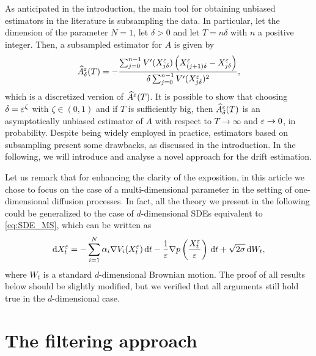 \documentclass[10pt]{article}
\begin{document}
As anticipated in the introduction, the main tool for obtaining unbiased estimators in the literature is subsampling the data. In particular, let the dimension of the parameter $N = 1$, let $\delta > 0$ and let $T = n\delta$ with $n$ a positive integer. Then, a subsampled estimator for $A$ is given by
\begin{equation}
	\widehat A^\varepsilon_\delta(T) = - \frac{\sum_{j=0}^{n-1} V'(X^\varepsilon_{j\delta})\left(X^\varepsilon_{(j+1)\delta} - X^\varepsilon_{j\delta}\right)}{\delta \sum_{j=0}^{n-1} V'(X^\varepsilon_{j\delta})^2},
\end{equation}
which is a discretized version of $\widehat A^\varepsilon(T)$. It is possible to show \cite[Theorem 3.5]{PaS07} that choosing $\delta = \varepsilon^\zeta$ with $\zeta \in (0, 1)$ and if $T$ is sufficiently big, then $\widehat A^\varepsilon_\delta(T)$ is an asymptotically unbiased estimator of $A$ with respect to $T \to \infty$ and $\varepsilon \to 0$, in probability. Despite being widely employed in practice, estimators based on subsampling present some drawbacks, as discussed in the introduction. In the following, we will introduce and analyse a novel approach for the drift estimation.

\begin{remark} Let us remark that for enhancing the clarity of the exposition, in this article we chose to focus on the case of a multi-dimensional parameter in the setting of one-dimensional diffusion processes. In fact, all the theory we present in the following could be generalized to the case of $d$-dimensional SDEs equivalent to \eqref{eq:SDE_MS}, which can be written as
	\begin{equation}
		\mathrm{d} X_t^\varepsilon = - \sum_{i=1}^N \alpha_i \nabla V_i(X_t^\varepsilon) \,\mathrm{d} t - \frac1{\varepsilon} \nabla p\left(\frac{X_t^\varepsilon}{\varepsilon}\right) \,\mathrm{d} t + \sqrt{2\sigma} \,\mathrm{d} W_t,
	\end{equation}
	where $W_t$ is a standard $d$-dimensional Brownian motion. The proof of all results below should be slightly modified, but we verified that all arguments still hold true in the $d$-dimensional case. 
\end{remark}

\section{The filtering approach}\label{sec:Filter}
\end{document}
